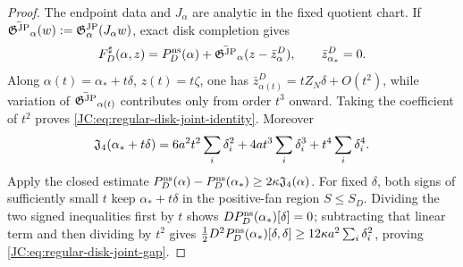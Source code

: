 \begin{proof}
The endpoint data and $J_\alpha$ are analytic in the fixed quotient
chart.  If
$\bar{\mathfrak G^{\rm JP}}_\alpha(w):=\mathfrak G^{\rm JP}_\alpha(J_\alpha w)$, exact disk completion gives
\[
 F_D^\sharp(\alpha,z)
 =P_D^{\rm ns}(\alpha)
  +\bar{\mathfrak G^{\rm JP}}_\alpha(z-\bar z_\alpha^D),
\qquad \bar z_{\alpha_*}^D=0.
\]
Along $\alpha(t)=\alpha_*+t\delta$, $z(t)=t\zeta$, one has
$\bar z_{\alpha(t)}^D=tZ_N\delta+O(t^2)$, while variation of
$\bar{\mathfrak G^{\rm JP}}_{\alpha(t)}$ contributes only from order $t^3$ onward.  Taking
the coefficient of $t^2$ proves
\eqref{JC:eq:regular-disk-joint-identity}.  Moreover
\[
 \mathfrak J_4(\alpha_*+t\delta)
 =6a^2t^2\sum_i\delta_i^2
  +4at^3\sum_i\delta_i^3+t^4\sum_i\delta_i^4.
\]
Apply the closed estimate
$P_D^{\rm ns}(\alpha)-P_D^{\rm ns}(\alpha_*)
\ge2\kappa\mathfrak J_4(\alpha)$.  For fixed $\delta$, both signs of sufficiently
small $t$ keep $\alpha_*+t\delta$ in the positive-fan region
$S\le S_D$.  Dividing the two signed inequalities first by $t$ shows
$DP_D^{\rm ns}(\alpha_*)[\delta]=0$; subtracting that linear term and
then dividing by $t^2$ gives
$\frac12D^2P_D^{\rm ns}(\alpha_*)[\delta,\delta]
\ge12\kappa a^2\sum_i\delta_i^2$, proving
\eqref{JC:eq:regular-disk-joint-gap}.
\end{proof}

